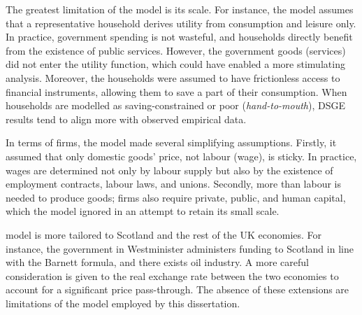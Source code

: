The greatest limitation of the model is its scale. For instance, the model assumes that a representative household derives utility from consumption and leisure only. In practice, government spending is not wasteful, and households directly benefit from the existence of public services. However, the government goods (services) did not enter the utility function, which could have enabled a more stimulating analysis. Moreover, the households were assumed to have frictionless access to financial instruments, allowing them to save a part of their consumption. When households are modelled as saving-constrained or poor (\textit{hand-to-mouth}), DSGE results tend to align more with observed empirical data.

In terms of firms, the model made several simplifying assumptions. Firstly, it assumed that only domestic goods' price, not labour (wage), is sticky. In practice, wages are determined not only by labour supply but also by the existence of employment contracts, labour laws, and unions. Secondly, more than labour is needed to produce goods; firms also require private, public, and human capital, which the model ignored in an attempt to retain its small scale. 

\textcite{ricci_2019_essays} model is more tailored to Scotland and the rest of the UK economies. For instance, the government in Westminister administers funding to Scotland in line with the Barnett formula, and there exists oil industry. A more careful consideration is given to the real exchange rate between the two economies to account for a significant price pass-through. The absence of these extensions are limitations of the model employed by this dissertation.